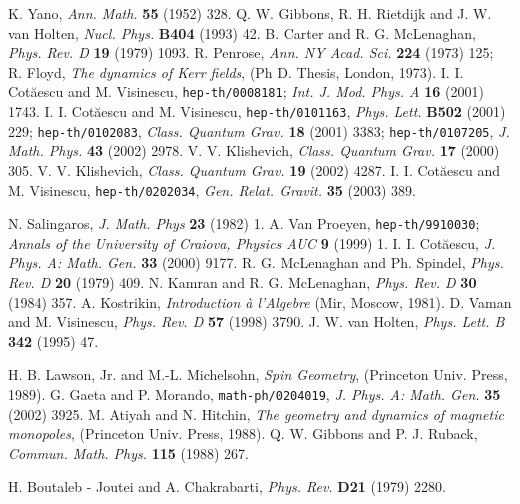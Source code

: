 \documentclass[a4paper,12pt]{article}
\begin{document}
\begin{thebibliography}{99}
K. Yano, {\em Ann. Math.} {\bf 55} (1952) 328.
%
Q. W. Gibbons, R. H. Rietdijk and J. W. van Holten, 
{\em Nucl. Phys.} {\bf B404} (1993) 42.
%
B. Carter and R. G. McLenaghan, {\em Phys. Rev. D} {\bf 19} (1979) 1093.
%
R. Penrose, {\em Ann. NY Acad. Sci.} {\bf 224} (1973) 125;
R. Floyd, {\em The dynamics of Kerr fields}, (Ph D. Thesis, London,
1973).
%
I.  I.  Cot\u aescu and M.  Visinescu,
{\tt hep-th/0008181}; {\em Int.  J.  Mod.  Phys.  A} {\bf 16} (2001) 1743. 
%
I.  I.  Cot\u aescu and M.  Visinescu, 
{\tt hep-th/0101163}, {\em Phys. Lett.} {\bf B502} (2001) 229; 
{\tt hep-th/0102083}, {\em Class. Quantum Grav.} {\bf 18} (2001) 3383;  
{\tt hep-th/0107205}, {\em J. Math. Phys.} {\bf 43} (2002) 2978. 
%
V. V. Klishevich, {\em Class. Quantum Grav.} {\bf 17} (2000) 305.
%
V. V. Klishevich, {\em Class. Quantum Grav.} {\bf 19} (2002) 4287.
I.  I.  Cot\u aescu and M.  Visinescu, {\tt hep-th/0202034},
{\em Gen.  Relat.  Gravit.} {\bf 35} (2003) 389. 
%

N. Salingaros, {\em J. Math. Phys} {\bf 23} (1982) 1.
%
A. Van Proeyen, {\tt hep-th/9910030}; {\em Annals of the University of 
Craiova, Physics AUC} {\bf 9} (1999) 1.
%
I. I. Cot\u aescu, {\em J. Phys. A: Math. Gen.} {\bf 33} (2000) 9177.
%
R. G. McLenaghan and Ph. Spindel, {\em Phys. Rev. D} {\bf 20} (1979) 409.  
%
N. Kamran and R. G. McLenaghan, {\em Phys. Rev. D} {\bf 30} (1984) 357.
%
A. Kostrikin, {\em Introduction \` a l'Algebre} (Mir, Moscow, 1981).
%
D. Vaman  and M. Visinescu, {\em Phys. Rev. D} {\bf 57} (1998) 3790.
%
J. W. van Holten, {\em Phys. Lett. B} {\bf 342} (1995) 47.
%


H. B. Lawson, Jr. and M.-L. Michelsohn, {\em Spin Geometry}, 
(Princeton Univ. Press, 1989).
%
G. Gaeta and P. Morando, {\tt math-ph/0204019}, 
{\em J. Phys. A: Math. Gen.} {\bf 35} (2002) 3925. 
%
M. Atiyah and N. Hitchin, {\em The geometry and dynamics of magnetic  
monopoles}, (Princeton Univ. Press, 1988).
%
Q. W. Gibbons and P. J. Ruback, 
{\em Commun. Math. Phys.} {\bf 115} (1988) 267.
%

H.  Boutaleb - Joutei and A.  Chakrabarti, {\em Phys.  Rev.} {\bf D21} 
(1979) 2280.
% 
\end{thebibliography}
\end{document}
